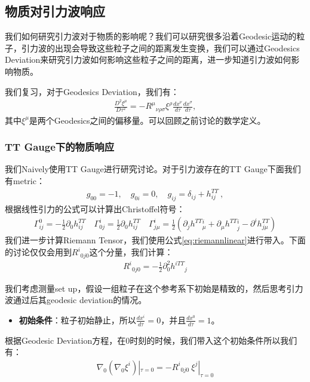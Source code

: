 \subsection{物质对引力波响应}

\bigskip
{}

我们如何研究引力波对于物质的影响呢？我们可以研究很多沿着Geodesic运动的粒子，引力波的出现会导致这些粒子之间的距离发生变换，我们可以通过Geodesics Deviation来研究引力波如何影响这些粒子之间的距离，进一步知道引力波如何影响物质。

我们复习，对于Geodesics Deviation，我们有：
\begin{align}
  \frac{D^2\xi^\mu}{D\tau^2}=-R^\mu{}_{\nu\rho\sigma}\xi^\rho\left.\frac{dx^\nu}{d\tau}\frac{dx^\sigma}{d\tau}\right.,
\end{align}
其中$ \xi^\mu $是两个Geodesics之间的偏移量。可以回顾之前讨论的数学定义。

\subsubsection{TT Gauge下的物质响应}

\bigskip
{}

我们Naively使用TT Gauge进行研究讨论。对于引力波存在的TT Gauge下面我们有metric：
\begin{align}
  g_{00}= -1, \quad g_{0i}=0, \quad g_{ij}=\delta_{ij}+h_{ij}^{TT}\mathrm{~,}
\end{align}
根据线性引力的公式可以计算出Christoffel符号：
\begin{align}
  \Gamma_{ij}^{0}=-\frac{1}{2}\partial_{0}h_{ij}^{TT} \quad \Gamma_{0j}^{i}=\frac{1}{2}\partial_{0}h_{ij}^{TT}\quad \Gamma_{j\mu}^{i}=\frac{1}{2}(\partial_{j}h^{TT}{}_\mu^i+\partial_{\mu}h^{TT}{}^{i}_j-\partial^{i}h_{j\mu}^{TT})
\end{align}
我们进一步计算Riemann Tensor，我们使用公式\cref{eq:riemannlinear}进行带入。下面的讨论仅仅会用到$ R^{i}{}_{0j0} $这个分量，我们计算：
\begin{align}
  R^{i}{}_{0j0}=-\frac{1}{2}\partial_{0}^{2}h^{iTT}{}_{j}
\end{align}


\bigskip
{}


我们考虑测量set up，假设一组粒子在这个参考系下初始是精致的，然后思考引力波通过后其geodesic deviation的情况。
\begin{itemize}
  \item \textbf{初始条件}：粒子初始静止，所以$ \frac{dx^i}{d\tau} = 0 $，并且$ \frac{dx^0}{d\tau} = 1 $。
\end{itemize}
根据Geodesic Deviation方程，在0时刻的时候，我们带入这个初始条件所以我们有：
\begin{align}
  \nabla_{0}(\nabla_{0}\xi^{i})|_{\tau=0}=-R^{i}{}_{0j0} \ \xi^{j}|_{\tau=0}
\end{align}


